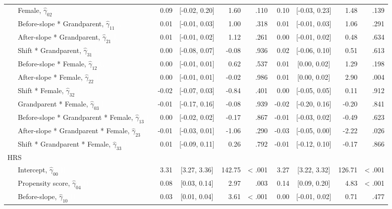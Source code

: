 \documentclass[
  english,
  man,floatsintext]{apa7}
\newenvironment{lltable}{\begin{landscape}\begin{center}\begin{ThreePartTable}}{\end{ThreePartTable}\end{center}\end{landscape}}
\begin{document}
\begin{lltable}
{\begin{longtable}{lrcrrrcrr}
\ \ \ Female, $\hat{\gamma}_{02}$ \textcolor{white}{L} & 0.09 & {}[-0.02, 0.20] & 1.60 & .110 & 0.10 & {}[-0.03, 0.23] & 1.48 & .139\\
\ \ \ Before-slope * Grandparent, $\hat{\gamma}_{11}$ \textcolor{white}{L} & 0.01 & {}[-0.01, 0.03] & 1.00 & .318 & 0.01 & {}[-0.01, 0.03] & 1.06 & .291\\
\ \ \ After-slope * Grandparent, $\hat{\gamma}_{21}$ \textcolor{white}{L} & 0.01 & {}[-0.01, 0.02] & 1.12 & .261 & 0.00 & {}[-0.01, 0.02] & 0.48 & .634\\
\ \ \ Shift * Grandparent, $\hat{\gamma}_{31}$ \textcolor{white}{L} & 0.00 & {}[-0.08, 0.07] & -0.08 & .936 & 0.02 & {}[-0.06, 0.10] & 0.51 & .613\\
\ \ \ Before-slope * Female, $\hat{\gamma}_{12}$ \textcolor{white}{L} & 0.00 & {}[-0.01, 0.01] & 0.62 & .537 & 0.01 & {}[0.00, 0.02] & 1.29 & .198\\
\ \ \ After-slope * Female, $\hat{\gamma}_{22}$ \textcolor{white}{L} & 0.00 & {}[-0.01, 0.01] & -0.02 & .986 & 0.01 & {}[0.00, 0.02] & 2.90 & .004\\
\ \ \ Shift * Female, $\hat{\gamma}_{32}$ \textcolor{white}{L} & -0.02 & {}[-0.07, 0.03] & -0.84 & .401 & 0.00 & {}[-0.05, 0.05] & 0.11 & .912\\
\ \ \ Grandparent * Female, $\hat{\gamma}_{03}$ \textcolor{white}{L} & -0.01 & {}[-0.17, 0.16] & -0.08 & .939 & -0.02 & {}[-0.20, 0.16] & -0.20 & .841\\
\ \ \ Before-slope * Grandparent * Female, $\hat{\gamma}_{13}$ \textcolor{white}{L} & 0.00 & {}[-0.02, 0.02] & -0.17 & .867 & -0.01 & {}[-0.03, 0.02] & -0.49 & .623\\
\ \ \ After-slope * Grandparent * Female, $\hat{\gamma}_{23}$ \textcolor{white}{L} & -0.01 & {}[-0.03, 0.01] & -1.06 & .290 & -0.03 & {}[-0.05, 0.00] & -2.22 & .026\\
\ \ \ Shift * Grandparent * Female, $\hat{\gamma}_{33}$ \textcolor{white}{L} & 0.01 & {}[-0.09, 0.11] & 0.26 & .792 & -0.01 & {}[-0.12, 0.10] & -0.17 & .866\\
HRS &  &  &  &  &  &  &  & \\
\ \ \ Intercept, $\hat{\gamma}_{00}$ \textcolor{white}{H} & 3.31 & {}[3.27, 3.36] & 142.75 & < .001 & 3.27 & {}[3.22, 3.32] & 126.71 & < .001\\
\ \ \ Propensity score, $\hat{\gamma}_{04}$ \textcolor{white}{H} & 0.08 & {}[0.03, 0.14] & 2.97 & .003 & 0.14 & {}[0.09, 0.20] & 4.83 & < .001\\
\ \ \ Before-slope, $\hat{\gamma}_{10}$ \textcolor{white}{H} & 0.03 & {}[0.01, 0.04] & 3.61 & < .001 & 0.00 & {}[-0.01, 0.02] & 0.71 & .477\\

\end{longtable}}
\end{lltable}
\end{document}
